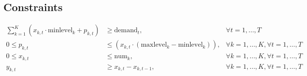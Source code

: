 \documentclass{article}
\begin{document}
\subsection*{Constraints}
\begin{align}
\sum_{k=1}^{K} \left( x_{k, t} \cdot \text{minlevel}_k + p_{k, t} \right) & \geq \text{demand}_t, & \forall t = 1,\ldots,T \\
0 \leq p_{k,t} & \leq (x_{k,t} \cdot (\text{maxlevel}_k - \text{minlevel}_k)), & \forall k = 1,\ldots,K, \forall t = 1,\ldots,T \\
0 \leq x_{k,t} & \leq \text{num}_k, & \forall k = 1,\ldots,K, \forall t = 1,\ldots,T \\
y_{k,t} & \geq x_{k,t} - x_{k,t-1}, & \forall k = 1,\ldots,K, \forall t = 1,\ldots,T
\end{align}
\end{document}
